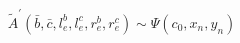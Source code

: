 \begin{equation}
\tilde{A}^{\prime }(\bar{b},\bar{c},l_{e}^{b},l_{e}^{c},r_{e}^{b},r_{e}^{c})%
\sim \Psi (c_{0},x_{n},y_{n})  \label{eq:corr_evenfield}
\end{equation}

